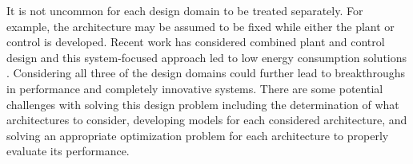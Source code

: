 It is not uncommon for each design domain to be treated separately.
For example, the architecture may be assumed to be fixed while either the plant or control is developed.
Recent work has considered combined plant and control design and this system-focused approach led to low energy consumption solutions \cite{Allison2013d}.
Considering all three of the design domains could further lead to breakthroughs in performance and completely innovative systems.
There are some potential challenges with solving this design problem including the determination of what architectures to consider, developing models for each considered architecture, and solving an appropriate optimization problem for each architecture to properly evaluate its performance.
